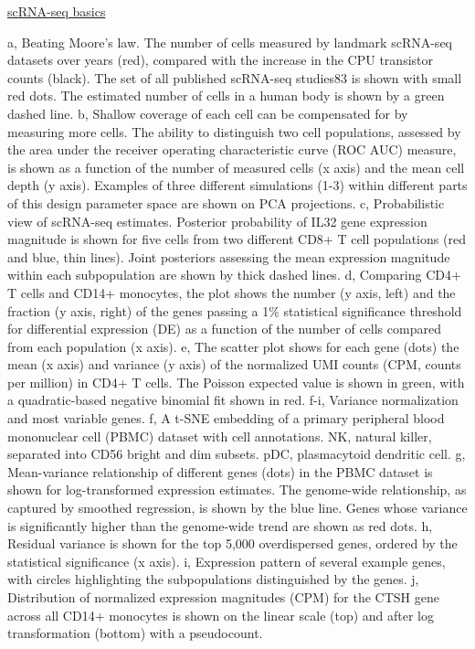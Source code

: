 \documentclass[
]{book}
\begin{document}
\href{https://www.nature.com/articles/s41592-021-01171-x/figures/3}{scRNA-seq basics}

a, Beating Moore's law. The number of cells measured by landmark scRNA-seq datasets over years (red), compared with the increase in the CPU transistor counts (black). The set of all published scRNA-seq studies83 is shown with small red dots. The estimated number of cells in a human body is shown by a green dashed line.
b, Shallow coverage of each cell can be compensated for by measuring more cells. The ability to distinguish two cell populations, assessed by the area under the receiver operating characteristic curve (ROC AUC) measure, is shown as a function of the number of measured cells (x axis) and the mean cell depth (y axis). Examples of three different simulations (1-3) within different parts of this design parameter space are shown on PCA projections.
c, Probabilistic view of scRNA-seq estimates. Posterior probability of IL32 gene expression magnitude is shown for five cells from two different CD8+ T cell populations (red and blue, thin lines). Joint posteriors assessing the mean expression magnitude within each subpopulation are shown by thick dashed lines.
d, Comparing CD4+ T cells and CD14+ monocytes, the plot shows the number (y axis, left) and the fraction (y axis, right) of the genes passing a 1\% statistical significance threshold for differential expression (DE) as a function of the number of cells compared from each population (x axis).
e, The scatter plot shows for each gene (dots) the mean (x axis) and variance (y axis) of the normalized UMI counts (CPM, counts per million) in CD4+ T cells. The Poisson expected value is shown in green, with a quadratic-based negative binomial fit shown in red. f-i, Variance normalization and most variable genes.
f, A t-SNE embedding of a primary peripheral blood mononuclear cell (PBMC) dataset with cell annotations. NK, natural killer, separated into CD56 bright and dim subsets. pDC, plasmacytoid dendritic cell.
g, Mean-variance relationship of different genes (dots) in the PBMC dataset is shown for log-transformed expression estimates. The genome-wide relationship, as captured by smoothed regression, is shown by the blue line. Genes whose variance is significantly higher than the genome-wide trend are shown as red dots.
h, Residual variance is shown for the top 5,000 overdispersed genes, ordered by the statistical significance (x axis).
i, Expression pattern of several example genes, with circles highlighting the subpopulations distinguished by the genes.
j, Distribution of normalized expression magnitudes (CPM) for the CTSH gene across all CD14+ monocytes is shown on the linear scale (top) and after log transformation (bottom) with a pseudocount.
\end{document}
